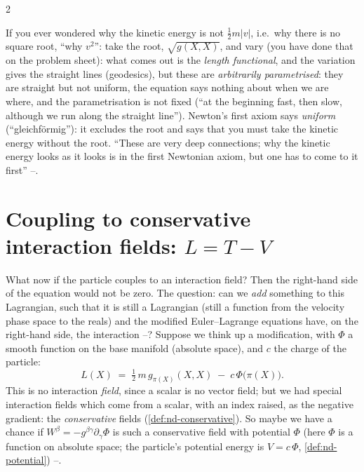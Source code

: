 \begin{paracol}{2}
\begin{coursenote}\label{cn:var-sqrt}
If you ever wondered why the kinetic energy is not $\tfrac12m|v|$, i.e.\ why there is no square root, ``why $v^2$'': take the root, $\sqrt{g(X,X)}$, and vary (you have done that on the problem sheet): what comes out is the \emph{length functional}, and the variation gives the straight lines (geodesics), but these are \emph{arbitrarily parametrised}: they are straight but not uniform, the equation says nothing about when we are where, and the parametrisation is not fixed (``at the beginning fast, then slow, although we run along the straight line''). Newton's first axiom says \emph{uniform} (``gleichf\"ormig''): it excludes the root and says that you must take the kinetic energy without the root. ``These are very deep connections; why the kinetic energy looks as it looks is in the first Newtonian axiom, but one has to come to it first'' --.
\end{coursenote}

\section{Coupling to conservative interaction fields: $L=T-V$}\label{sec:var-coupled}

What now if the particle couples to an interaction field? Then the right-hand side of the equation would not be zero. The question: can we \emph{add} something to this Lagrangian, such that it is still a Lagrangian (still a function from the velocity phase space to the reals) and the modified Euler--Lagrange equations have, on the right-hand side, the interaction --? Suppose we think up a modification, with $\Phi$ a smooth function on the base manifold (absolute space), and $c$ the charge of the particle:
\begin{equation}\label{eq:var-Lcoupled}
  L(X)\;=\;\tfrac12\,m\,g_{\pi(X)}(X,X)\;-\;c\,\Phi\bigl(\pi(X)\bigr).
\end{equation}
This is no interaction \emph{field}, since a scalar is no vector field; but we had special interaction fields which come from a scalar, with an index raised, as the negative gradient: the \emph{conservative} fields (\cref{def:nd-conservative}). So maybe we have a chance if $W^\beta=-g^{\beta\gamma}\partial_\gamma\Phi$ is such a conservative field with potential $\Phi$ (here $\Phi$ is a function on absolute space; the particle's potential energy is $V=c\,\Phi$, \cref{def:nd-potential}) --.


\end{paracol}
